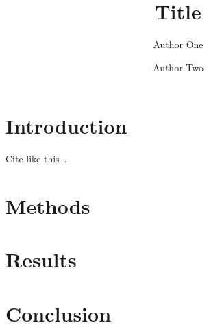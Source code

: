 \documentclass[unnumsec,webpdf,contemporary,large]{oup-authoring-template}
\title[Short title]{Title}
\author[1,$\ast$]{Author One}
\author[2]{Author Two}
\begin{document}
\maketitle
\section{Introduction}
Cite like this~\citep{example2026}.
\section{Methods}
\section{Results}
\section{Conclusion}


\end{document}
